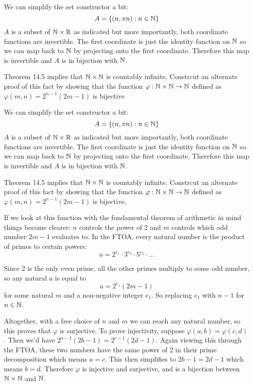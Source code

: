 \documentclass{article}
\begin{document}
We can simplify the set constructor a bit:
$$A = \{(n, \pi n): n \in \mathbb{N}\}$$
$A$ is a subset of $\mathbb{N} \times \mathbb{R}$ as indicated but more importantly, both coordinate functions are invertible. The first coordinate is just the identity function on $\mathbb{N}$ so we can map back to $\mathbb{N}$ by projecting onto the first coordinate. Therefore this map is invertible and $A$ is in bijection with $\mathbb{N}$.

\begin{problem}
Theorem 14.5 implies that $\mathbb{N} \times \mathbb{N}$ is countably infinite. Constrcut an alternate proof of this fact by showing that the function $\varphi: \mathbb{N} \times \mathbb{N} \to \mathbb{N}$ defined as $\varphi(m, n) = 2^{n-1}(2m - 1)$ is bijective
\end{problem}

We can simplify the set constructor a bit:
$$A = \{(n, \pi n): n \in \mathbb{N}\}$$
$A$ is a subset of $\mathbb{N} \times \mathbb{R}$ as indicated but more importantly, both coordinate functions are invertible. The first coordinate is just the identity function on $\mathbb{N}$ so we can map back to $\mathbb{N}$ by projecting onto the first coordinate. Therefore this map is invertible and $A$ is in bijection with $\mathbb{N}$.

\begin{problem}
Theorem 14.5 implies that $\mathbb{N} \times \mathbb{N}$ is countably infinite. Constrcut an alternate proof of this fact by showing that the function $\varphi: \mathbb{N} \times \mathbb{N} \to \mathbb{N}$ defined as $\varphi(m, n) = 2^{n-1}(2m - 1)$ is bijective.
\end{problem}

If we look at this function with the fundamental theorem of arithmetic in mind things become clearer: $n$ controls the power of 2 and $m$ controls which odd number $2m -1 $ evaluates to. In the FTOA, every natural number is the product of primes to certain powers:
$$a = 2^{e_1}\cdot 3^{e_2} \cdot 5^{e_3} \cdot \ldots$$

Since 2 is the only even prime, all the other primes multiply to some odd number, so any natural $a$ is equal to
$$a = 2^{e_1}(2m-1)$$
for some natural $m$ and a non-negative integer $e_1$. So replacing $e_1$ with $n -1$ for $n \in \mathbb{N}$.

Altogether, with a free choice of $n$ and $m$ we can reach any natural number, so this proves that $\varphi$ is surjective. To prove injectivity, suppose $\varphi(a, b) = \varphi(c, d)$. Then we'd have $2^{a-1}(2b-1) = 2^{c-1}(2d-1)$. Again viewing this through the FTOA, these two numbers have the same power of 2 in their prime decomposition which means $a = c$. This then simplifies to $2b - 1 = 2d -1$ which means $b = d$. Therefore $\varphi$ is injective and surjective, and is a bijection between $\mathbb{N} \times \mathbb{N}$ and $\mathbb{N}$.
\end{document}

